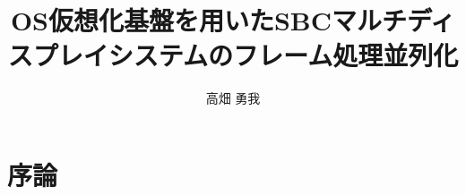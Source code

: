 \documentclass[12pt,a4paper]{jbook}
\title{OS仮想化基盤を用いたSBCマルチディスプレイシステムのフレーム処理並列化}
\author{高畑 勇我}
\begin{document}
\coverpage

\tableofcontents

\body

\chapter{序論}















\end{document}
